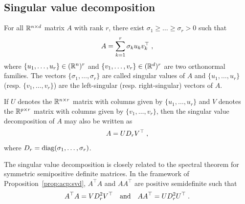 \subsection{Singular value decomposition}

\begin{shaded}
\begin{proposition} 
\label{prop:acp:svd}
For all $\mathbb{R}^{n \times d}$ matrix $A$ with rank $r$, there exist $\sigma_1\geqslant \ldots \geqslant \sigma_r>0$ such that
\[
A = \sum_{k=1}^r \sigma_k u_k v^\top_k\;,
\]
where $\{u_1,\ldots,u_r\}\in (\mathbb{R}^n)^r$ and $\{v_1,\ldots,v_r\}\in (\mathbb{R}^d)^r$ are two orthonormal families. The vectors $\{\sigma_1,\ldots,\sigma_r\}$ are called singular values of $A$ and $\{u_1,\ldots,u_r\}$ (resp. $\{v_1,\ldots,v_r\}$) are the left-singular (resp. right-singular) vectors of $A$.
\end{proposition}
\end{shaded}
\begin{remark}
If $U$ denotes the $\mathbb{R}^{n\times r}$ matrix with columns given by $\{u_1,\ldots,u_r\}$ and $V$ denotes the $\mathbb{R}^{p \times r}$ matrix with columns given by $\{v_1,\ldots,v_r\}$, then the singular value decomposition of $A$ may also be written as
\[
A = UD_rV^\top\;,
\]
where $D_r = \mathrm{diag}(\sigma_1,\ldots,\sigma_r)$.
\end{remark}
\begin{remark}
The singular value decomposition is closely related to the spectral theorem for symmetric semipositive definite matrices. In the framework of Proposition~\ref{prop:acp:svd}, $A^\top A$ and $AA^\top$ are positive semidefinite such that
\[
A^\top A = VD_r^2V^\top\quad\mathrm{and}\quad AA^\top = UD_r^2U^\top\;.
\]
\end{remark}
